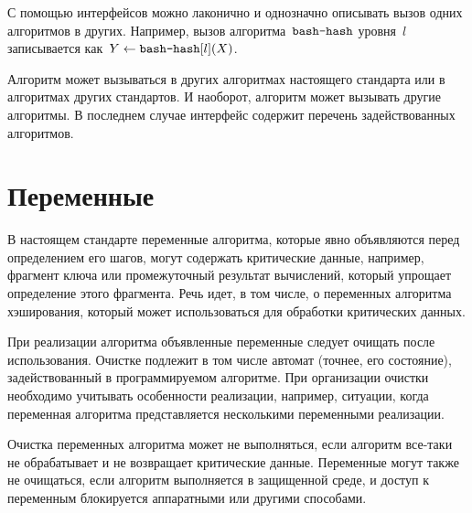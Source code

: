 С помощью интерфейсов можно лаконично и однозначно 
описывать вызов одних алгоритмов в других.
%        	
Например, вызов алгоритма~$\texttt{bash-hash}$ уровня~$l$
записывается как~$Y\leftarrow\texttt{bash-hash}[l](X)$.

Алгоритм может вызываться в других алгоритмах настоящего стандарта или 
в алгоритмах других стандартов. И наоборот, алгоритм может вызывать другие 
алгоритмы. В последнем случае интерфейс содержит перечень задействованных 
алгоритмов.

\section{Переменные}\label{COMMON.Vars}

В настоящем стандарте переменные алгоритма, которые явно объявляются перед 
определением его шагов, могут содержать критические данные, например, фрагмент 
ключа или промежуточный результат вычислений, который упрощает определение 
этого фрагмента.
%
Речь идет, в том числе, о переменных алгоритма хэширования, 
который может использоваться для обработки критических данных.

При реализации алгоритма объявленные переменные следует очищать после
использования. 
%
Очистке подлежит в том числе автомат (точнее, его состояние),
задействованный в программируемом алгоритме.
%
При организации очистки необходимо учитывать особенности
реализации, например, ситуации, когда переменная алгоритма представляется
несколькими переменными реализации.

Очистка переменных алгоритма может не выполняться, если алгоритм все-таки 
не обрабатывает и не возвращает критические данные.
%
Переменные могут также не очищаться, если алгоритм выполняется в защищенной 
среде, и доступ к переменным блокируется аппаратными или другими способами.


